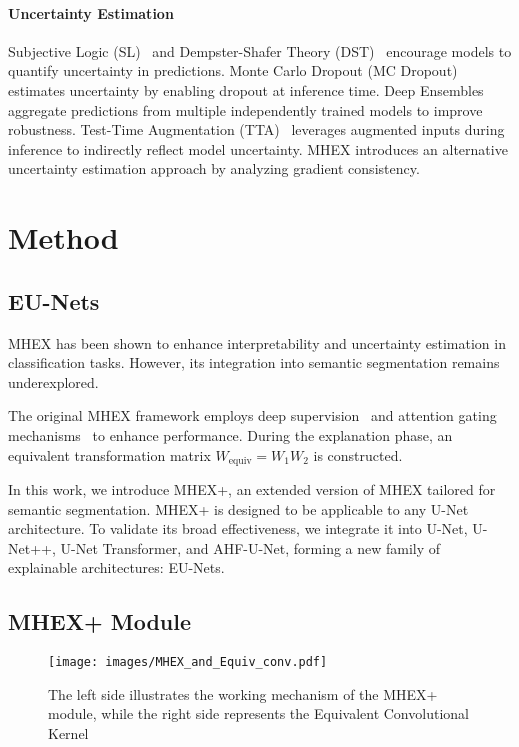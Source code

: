 \documentclass[runningheads]{llncs}
\begin{document}
\paragraph{Uncertainty Estimation}  
Subjective Logic (SL)~\cite{subjectiveLogic} and Dempster-Shafer Theory (DST)~\cite{DempsterShafer} encourage models to quantify uncertainty in predictions. Monte Carlo Dropout (MC Dropout)~\cite{gal2016dropout} estimates uncertainty by enabling dropout at inference time. Deep Ensembles~\cite{lakshminarayanan2017simplescalablepredictiveuncertainty} aggregate predictions from multiple independently trained models to improve robustness. Test-Time Augmentation (TTA)~\cite{TTA} leverages augmented inputs during inference to indirectly reflect model uncertainty. MHEX\cite{mhex} introduces an alternative uncertainty estimation approach by analyzing gradient consistency. 

\section{Method}
\subsection{EU-Nets}

MHEX has been shown to enhance interpretability and uncertainty estimation in classification tasks. However, its integration into semantic segmentation remains underexplored. 

The original MHEX framework \cite{mhex} employs deep supervision~\cite{lee2014deeplysupervisednets,li2022comprehensivereviewdeepsupervision} and attention gating mechanisms~\cite{schlemper2019attention} to enhance performance. During the explanation phase, an equivalent transformation matrix \( W_{\text{equiv}} = W_1 W_2 \) is constructed.

In this work, we introduce MHEX+, an extended version of MHEX tailored for semantic segmentation. MHEX+ is designed to be applicable to any U-Net architecture. To validate its broad effectiveness, we integrate it into U-Net, U-Net++, U-Net Transformer, and AHF-U-Net, forming a new family of explainable architectures: EU-Nets.

\subsection{MHEX+ Module}
\label{sec:MHEX_Module}

\begin{figure}
    \centering
    \texttt{[image: images/MHEX\_and\_Equiv\_conv.pdf]}
    \caption{The left side illustrates the working mechanism of the MHEX+ module, while the right side represents the Equivalent Convolutional Kernel}
    \label{fig:mhex_equivConv}
\end{figure}
\end{document}
